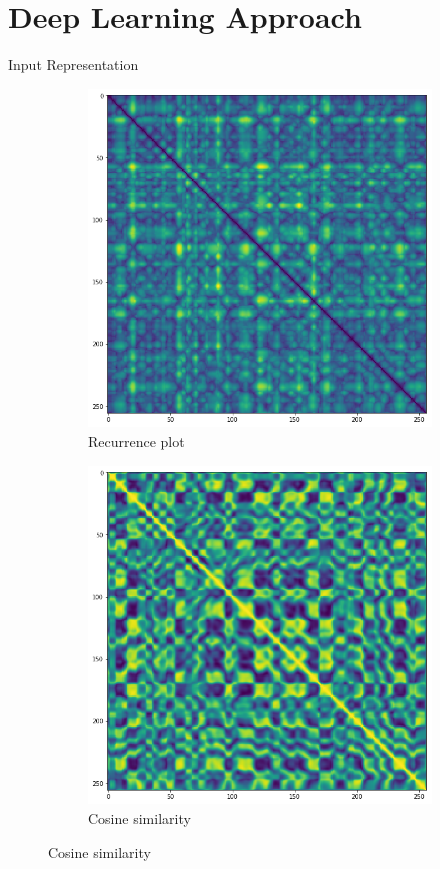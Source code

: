 \documentclass{beamer}
\begin{document}
\section{Deep Learning Approach}


\begin{frame}{Input Representation}
\begin{figure}
\centering
\begin{subfigure}{.5\textwidth}
  \centering
  \includegraphics[width=.9\linewidth]{./Images/chebyshev.png}
  \caption{Recurrence plot}
\end{subfigure}%
\begin{subfigure}{.5\textwidth}
  \centering
  \includegraphics[width=.9\linewidth]{./Images/cs.png}
  \caption{Cosine similarity}
\end{subfigure}
\end{figure}
\end{frame}
\end{document}
